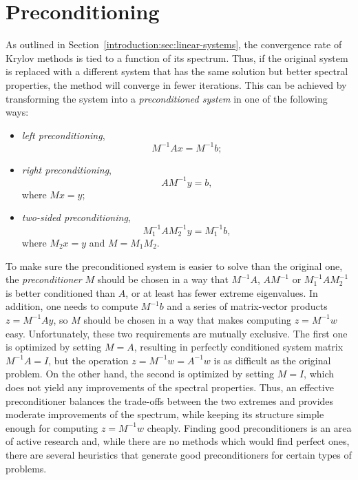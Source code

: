 \section{Preconditioning}

As outlined in Section~\ref{introduction:sec:linear-systems}, the convergence
rate of Krylov methods is tied to a function of its spectrum. Thus, if the
original system is replaced with a different system that has the same solution
but better spectral properties, the method will converge in fewer iterations.
This can be achieved by transforming the system into a \emph{preconditioned
system} in one of the following ways:
\begin{itemize}
\item \emph{left preconditioning},
\begin{equation}
    M^{-1}Ax = M^{-1}b;
\end{equation}
\item \emph{right preconditioning},
\begin{equation}
    AM^{-1}y = b,
\end{equation}
where $Mx = y$;
\item \emph{two-sided preconditioning},
\begin{equation}
    M_1^{-1}AM_2^{-1} y = M_1^{-1}b,
\end{equation}
where $M_2x = y$ and $M = M_1 M_2$.
\end{itemize}

To make sure the preconditioned system is easier to solve than the original one,
the \emph{preconditioner} $M$ should be chosen in a way that $M^{-1}A$,
$AM^{-1}$ or $M_1^{-1}AM_2^{-1}$ is better conditioned than $A$, or at least has
fewer extreme eigenvalues. In addition, one needs to compute $M^{-1}b$ and a
series of matrix-vector products $z = M^{-1}Ay$, so $M$ should be chosen in a
way that makes computing $z = M^{-1}w$ easy. Unfortunately, these two
requirements are mutually exclusive. The first one is optimized by setting
$M = A$, resulting in perfectly conditioned system matrix $M^{-1}A = I$, but
the operation $z = M^{-1}w = A^{-1}w$ is as difficult as the original problem.
On the other hand, the second is optimized by setting $M = I$, which does
not yield any improvements of the spectral properties. Thus, an effective
preconditioner balances the trade-offs between the two extremes and provides
moderate improvements of the spectrum, while keeping its structure simple enough
for computing $z = M^{-1}w$ cheaply. Finding good preconditioners is an area of
active research and, while there are no methods which would find perfect ones,
there are several heuristics that generate good preconditioners for certain
types of problems.

